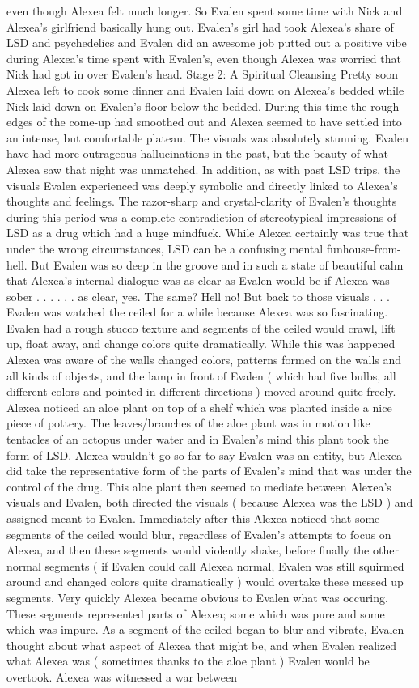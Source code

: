 \documentclass[12pt]{book}
\begin{document}
even though Alexea felt much longer. So Evalen spent some time with Nick and Alexea's girlfriend basically hung out. Evalen's girl had took Alexea's share of LSD and psychedelics and Evalen did an awesome job putted out a positive vibe during Alexea's time spent with Evalen's, even though Alexea was worried that Nick had got in over Evalen's head. Stage 2: A Spiritual Cleansing Pretty soon Alexea left to cook some dinner and Evalen laid down on Alexea's bedded while Nick laid down on Evalen's floor below the bedded. During this time the rough edges of the come-up had smoothed out and Alexea seemed to have settled into an intense, but comfortable plateau. The visuals was absolutely stunning. Evalen have had more outrageous hallucinations in the past, but the beauty of what Alexea saw that night was unmatched. In addition, as with past LSD trips, the visuals Evalen experienced was deeply symbolic and directly linked to Alexea's thoughts and feelings. The razor-sharp and crystal-clarity of Evalen's thoughts during this period was a complete contradiction of stereotypical impressions of LSD as a drug which had a huge mindfuck. While Alexea certainly was true that under the wrong circumstances, LSD can be a confusing mental funhouse-from-hell. But Evalen was so deep in the groove and in such a state of beautiful calm that Alexea's internal dialogue was as clear as Evalen would be if Alexea was sober . . .   . . .  as clear, yes. The same? Hell no! But back to those visuals . . .  Evalen was watched the ceiled for a while because Alexea was so fascinating. Evalen had a rough stucco texture and segments of the ceiled would crawl, lift up, float away, and change colors quite dramatically. While this was happened Alexea was aware of the walls changed colors, patterns formed on the walls and all kinds of objects, and the lamp in front of Evalen ( which had five bulbs, all different colors and pointed in different directions ) moved around quite freely. Alexea noticed an aloe plant on top of a shelf which was planted inside a nice piece of pottery. The leaves/branches of the aloe plant was in motion like tentacles of an octopus under water and in Evalen's mind this plant took the form of LSD. Alexea wouldn't go so far to say Evalen was an entity, but Alexea did take the representative form of the parts of Evalen's mind that was under the control of the drug. This aloe plant then seemed to mediate between Alexea's visuals and Evalen, both directed the visuals ( because Alexea was the LSD ) and assigned meant to Evalen. Immediately after this Alexea noticed that some segments of the ceiled would blur, regardless of Evalen's attempts to focus on Alexea, and then these segments would violently shake, before finally the other normal segments ( if Evalen could call Alexea normal, Evalen was still squirmed around and changed colors quite dramatically ) would overtake these messed up segments. Very quickly Alexea became obvious to Evalen what was occuring. These segments represented parts of Alexea; some which was pure and some which was impure. As a segment of the ceiled began to blur and vibrate, Evalen thought about what aspect of Alexea that might be, and when Evalen realized what Alexea was ( sometimes thanks to the aloe plant ) Evalen would be overtook. Alexea was witnessed a war between 
\end{document}
